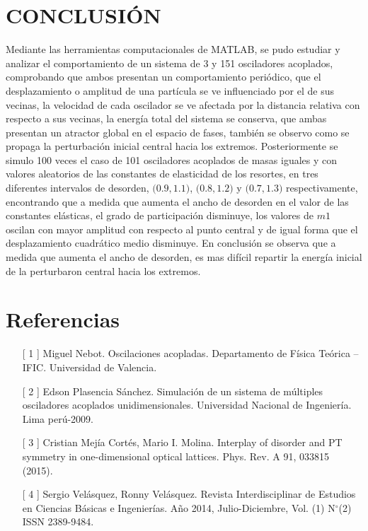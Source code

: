 \documentclass[11pt,letterpaper,twocolumn]{article}
\begin{document}
\section*{\normalsize{CONCLUSIÓN}}
Mediante las herramientas computacionales de MATLAB, se pudo estudiar y analizar el comportamiento de un sistema de 3 y 151 osciladores acoplados, comprobando que ambos presentan un comportamiento periódico, que el desplazamiento o amplitud de una partícula se ve influenciado por el de sus vecinas, la velocidad de cada oscilador se ve afectada por la distancia relativa con respecto a sus vecinas, la energía total del sistema se conserva, que ambas presentan un atractor global en el espacio de fases, también se observo como se propaga la perturbación inicial central hacia los extremos. Posteriormente se simulo 100 veces el caso de 101 osciladores acoplados de masas iguales y con valores aleatorios de las constantes de elasticidad de los resortes, en tres diferentes intervalos de desorden, $(0$.$9,1$.$1)$, $(0$.$8,1$.$2)$ y $(0$.$7,1$.$3)$ respectivamente, encontrando que a medida que aumenta el ancho de desorden en el valor de las constantes elásticas, el grado de participación disminuye, los valores de $m1$ oscilan con mayor amplitud con respecto al punto central y de igual forma que el desplazamiento cuadrático medio disminuye. En conclusión se observa que a medida que aumenta el ancho de desorden, es mas difícil repartir la energía inicial de la perturbaron central hacia los extremos.  
\section*{Referencias} 
\begin{itemize} 
\item[[ 1]] Miguel Nebot. Oscilaciones acopladas. Departamento de Física Teórica – IFIC. Universidad de Valencia. 
\item[[ 2]] Edson Plasencia Sánchez. Simulación de un sistema de múltiples osciladores acoplados unidimensionales. Universidad Nacional de Ingeniería. Lima perú-2009.

\item[[ 3]] Cristian Mejía Cortés, Mario I. Molina. Interplay of disorder and PT symmetry in one-dimensional optical lattices. Phys. Rev. A 91, 033815 (2015). 

\item[[ 4]] Sergio Velásquez, Ronny Velásquez. Revista Interdisciplinar de Estudios en Ciencias Básicas e Ingenierías.
Año 2014, Julio-Diciembre, Vol. (1) N$^{\circ}$(2) ISSN 2389-9484.
\end{itemize}
\end{document}
